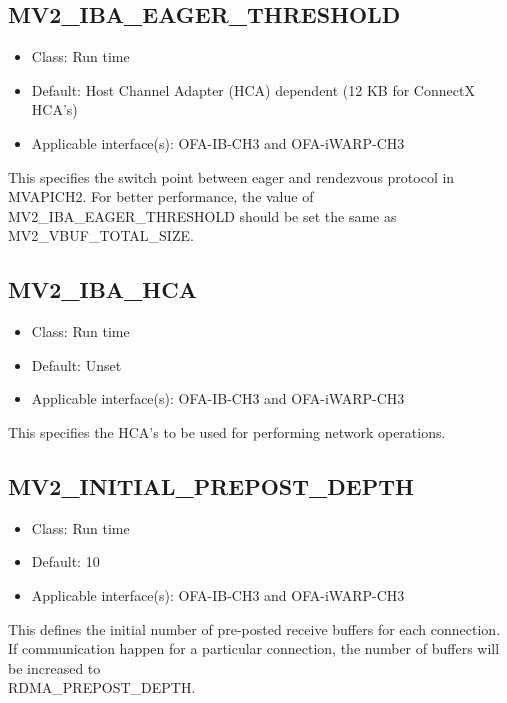\subsection{MV2\_IBA\_EAGER\_THRESHOLD}
\label{def:rdma-iba-eager-threshold}

\begin{itemize}
    \item Class: Run time

    \item Default: Host Channel Adapter (HCA) dependent (12 KB for ConnectX HCA's)
    \item Applicable interface(s): OFA-IB-CH3 and OFA-iWARP-CH3
\end{itemize}

This specifies the switch point between eager and rendezvous
protocol in MVAPICH2. For better performance, the value of 
MV2\_IBA\_EAGER\_THRESHOLD should be
set the same as MV2\_VBUF\_TOTAL\_SIZE.

\subsection{MV2\_IBA\_HCA}
\label{def:rdma-iba-hcas}

\begin{itemize}
    \item Class: Run time

    \item Default: Unset
    \item Applicable interface(s): OFA-IB-CH3 and OFA-iWARP-CH3
\end{itemize}

This specifies the HCA's to be used for performing network operations.

\subsection{MV2\_INITIAL\_PREPOST\_DEPTH}
\label{def:viadev-initial-prepost-depth}

\begin{itemize}
    \item Class: Run time

    \item Default: 10
    \item Applicable interface(s): OFA-IB-CH3 and OFA-iWARP-CH3
\end{itemize}

This defines the initial number of pre-posted receive buffers for each
connection. If communication happen for a particular connection, the
number of buffers will be increased to \\RDMA\_PREPOST\_DEPTH.

